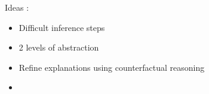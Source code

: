Ideas : 
\begin{itemize}
    \item Difficult inference steps
    \item 2 levels of abstraction
    \item Refine explanations using counterfactual reasoning
    \item 
\end{itemize}
